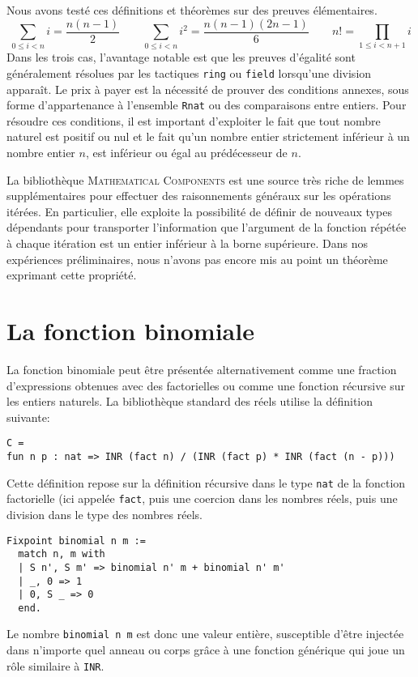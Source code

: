 \documentclass[draft]{jflart}
\newcommand{\mathcomp}{\textsc{Mathematical Components}}
\begin{document}
Nous avons testé ces définitions et théorèmes sur des preuves élémentaires.
\[\sum_{0 \leq i < n} i = \frac{n (n - 1)}{2} \qquad
\sum_{0 \leq i < n} i ^2 = \frac{n (n - 1) (2 n - 1)}{6} \qquad
n! = \prod_{1 \leq i < n + 1} i\]
Dans les trois cas, l'avantage notable est que les preuves d'égalité
sont généralement résolues par les tactiques \texttt{ring} ou \texttt{field}
lorsqu'une division apparaît.  Le prix à payer est la nécessité de
prouver des conditions annexes, sous forme d'appartenance à l'ensemble
\texttt{Rnat} ou des comparaisons entre entiers.  Pour résoudre ces
conditions, il est important d'exploiter le fait que tout nombre
naturel est positif ou nul et le fait qu'un nombre entier
strictement inférieur à un nombre entier \(n\), est inférieur ou égal au
prédécesseur de \(n\).

La bibliothèque \mathcomp{} est une source très riche de lemmes
supplémentaires pour effectuer des raisonnements généraux sur les
opérations itérées.  En particulier, elle exploite la possibilité de
définir de nouveaux types dépendants pour transporter l'information
que l'argument de la fonction répétée à chaque itération est un entier
inférieur à la borne supérieure.  Dans nos expériences préliminaires,
nous n'avons pas encore mis au point un théorème exprimant cette
propriété.


\section{La fonction binomiale}
La fonction binomiale peut être présentée alternativement comme une fraction
d'expressions obtenues avec des factorielles ou comme une
fonction récursive sur les entiers naturels.  La bibliothèque
standard des réels utilise la définition suivante:
\begin{verbatim}
C =
fun n p : nat => INR (fact n) / (INR (fact p) * INR (fact (n - p)))
\end{verbatim}
Cette définition repose sur la définition récursive dans le type 
\texttt{nat} de la fonction factorielle (ici appelée \texttt{fact}, puis
une coercion dans les nombres réels, puis une division dans le type
des nombres réels.
\begin{verbatim}
Fixpoint binomial n m :=
  match n, m with
  | S n', S m' => binomial n' m + binomial n' m'
  | _, 0 => 1
  | 0, S _ => 0
  end.
\end{verbatim}
Le nombre \texttt{binomial n m} est donc une valeur entière, susceptible
d'être injectée dans n'importe quel anneau ou corps grâce à une
fonction générique qui joue un rôle similaire à \texttt{INR}.
\end{document}
